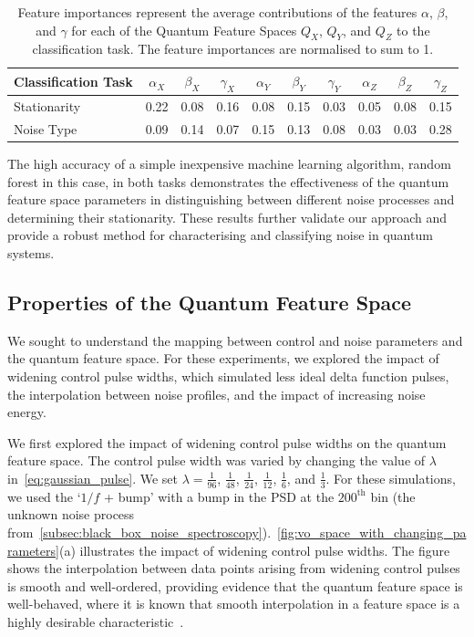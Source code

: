 \documentclass[12pt]{iopart}
\begin{document}
\begin{table}[ht]
    \centering
    \begin{tabular}{|l|c c c|c c c|c c c|}
        \hline
        Classification Task & \(\alpha_X\) & \(\beta_X\) & \(\gamma_X\) & \(\alpha_Y\) & \(\beta_Y\) & \(\gamma_Y\) & \(\alpha_Z\) & \(\beta_Z\) & \(\gamma_Z\) \\ \hline
        Stationarity        & 0.22         & 0.08        & 0.16         & 0.08         & 0.15        & 0.03         & 0.05         & 0.08        & 0.15         \\ \hline
        Noise Type          & 0.09         & 0.14        & 0.07         & 0.15         & 0.13        & 0.08         & 0.03         & 0.03        & 0.28         \\ \hline
    \end{tabular}
    \caption{Feature importances represent the average contributions of the features \(\alpha\), \(\beta\), and \(\gamma\) for each of the Quantum Feature Spaces \(Q_X\), \(Q_Y\), and \(Q_Z\) to the classification task. The feature importances are normalised to sum to 1.}
    \label{tab:feature_importances}
\end{table}

The high accuracy of a simple inexpensive machine learning algorithm, random forest in this case, in both tasks demonstrates the effectiveness of the quantum feature space parameters in distinguishing between different noise processes and determining their stationarity. These results further validate our approach and provide a robust method for characterising and classifying noise in quantum systems.

\subsection{Properties of the Quantum Feature Space \label{subsec:properties_of_vo_parameter_space}}
We sought to understand the mapping between control and noise parameters and the quantum feature space. For these experiments, we explored the impact of widening control pulse widths, which simulated less ideal delta function pulses, the interpolation between noise profiles, and the impact of increasing noise energy.

We first explored the impact of widening control pulse widths on the quantum feature space. The control pulse width was varied by changing the value of $\lambda$ in~\cref{eq:gaussian_pulse}. We set $\lambda = \frac{1}{96}$, $\frac{1}{48}$, $\frac{1}{24}$, $\frac{1}{12}$, $\frac{1}{6}$, and $\frac{1}{3}$. For these simulations, we used the `$1/f$ + bump' with a bump in the PSD at the $200^\mathrm{th}$ bin (the unknown noise process from~\cref{subsec:black_box_noise_spectroscopy}).~\cref{fig:vo_space_with_changing_parameters}(a) illustrates the impact of widening control pulse widths. The figure shows the interpolation between data points arising from widening control pulses is smooth and well-ordered, providing evidence that the quantum feature space is well-behaved, where it is known that smooth interpolation in a feature space is a highly desirable characteristic~\cite{bengio2013representation,radford2015unsupervised,guo2024smooth,higgins2017beta}.
\end{document}
